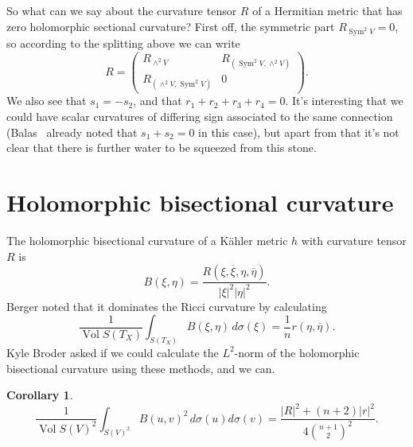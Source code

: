 \documentclass[10pt,a4paper]{amsart}
\newtheorem{coro}[theo]{Corollary}
\theoremstyle{definition}
\def\ov#1{\overline{#1}}
\DeclareMathOperator{\Sym}{Sym}
\DeclareMathOperator{\Vol}{Vol}
\begin{document}
So what can we say about the curvature tensor $R$ of a Hermitian metric that has
zero holomorphic sectional curvature?
First off, the symmetric part $R_{\Sym^2 V} = 0$, so according to the splitting
above we can write
$$
R = \begin{pmatrix}
R_{\wedge^2 V} & R_{(\Sym^2V, \wedge^2 V)}
\\
R_{(\wedge^2 V, \Sym^2V)} & 0
\end{pmatrix}.
$$
We also see that $s_1 = -s_2$, and that $r_1 + r_2 + r_3 + r_4 = 0$.
It's interesting that we could have scalar curvatures of differing sign
associated to the same connection (Balas~\cite{balas1985compact} already noted
that $s_1 + s_2 = 0$ in this case), but apart from that it's not clear that
there is further water to be squeezed from this stone.


\section{Holomorphic bisectional curvature}

The holomorphic bisectional curvature of a K\"ahler metric $h$ with curvature
tensor $R$ is
$$
B(\xi,\eta) = \frac{R(\xi, \ov\xi, \eta, \ov\eta)}{|\xi|^2 |\eta|^2}.
$$
Berger noted that it dominates the Ricci curvature by calculating
$$
\frac{1}{\Vol S(T_X)} \int_{S(T_X)} \!\!\! B(\xi, \eta) \, d\sigma(\xi)
= \frac{1}{n} r(\eta, \ov\eta).
$$
Kyle Broder asked if we could calculate the $L^2$-norm of the holomorphic
bisectional curvature using these methods, and we can.


\begin{coro}
$$
\frac{1}{\Vol S(V)^2}
\int_{S(V)^2} \!\!\! B(u, v)^2 \, d\sigma(u) d\sigma(v)
= \frac{|R|^2 + (n+2)|r|^2}{4\binom{n+1}{2}^2}.
$$
\end{coro}
\end{document}

